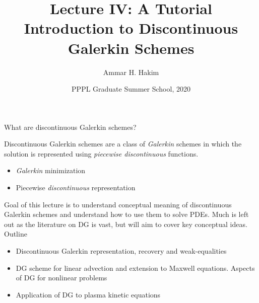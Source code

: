 \documentclass[pdf]{beamer}
\title[{\tt Intro to DG}] {Lecture IV: A Tutorial Introduction to
  Discontinuous Galerkin Schemes}%
\author[http://www.ammar-hakim.org/sj]%
{Ammar H. Hakim\inst{1}}%
\institute[PPPL]
{ \inst{1} Princeton Plasma Physics Laboratory, Princeton, NJ %
}
\date[8/14/2020]{PPPL Graduate Summer School, 2020}
\newcommand{\mypause}{}
\theoremstyle{definition}
\begin{document}
\begin{frame}
  \titlepage
\end{frame}

\begin{frame}{What are discontinuous Galerkin schemes?}

  \begin{block}{}
    Discontinuous Galerkin schemes are a class of \emph{Galerkin}
    schemes in which the solution is represented using \emph{piecewise
      discontinuous} functions.
  \end{block}
  \mypause
  \begin{itemize}
    \item \emph{Galerkin} minimization
    \item Piecewise \emph{discontinuous} representation
  \end{itemize}
  \mypause
  Goal of this lecture is to understand conceptual meaning of
  discontinuous Galerkin schemes and understand how to use them to
  solve PDEs. Much is left out as the literature on DG is vast, but
  will aim to cover key conceptual ideas. Outline

  \begin{itemize}
  \item Discontinuous Galerkin representation, recovery and
    weak-equalities
  \item DG scheme for linear advection and extension to Maxwell
    equations. Aspects of DG for nonlinear problems
  \item Application of DG to plasma kinetic equations
  \end{itemize}  
  
\end{frame}  
\end{document}

